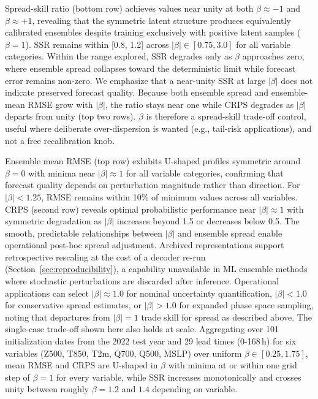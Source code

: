 \documentclass{agujournal2019}
\begin{document}
Spread-skill ratio (bottom row) achieves values near unity at both $\beta \approx -1$ and $\beta \approx +1$, revealing that the symmetric latent structure produces equivalently calibrated ensembles despite training exclusively with positive latent samples ($\beta = 1$). SSR remains within [0.8, 1.2] across $|\beta| \in [0.75, 3.0]$ for all variable categories. Within the range explored, SSR degrades only as $\beta$ approaches zero, where ensemble spread collapses toward the deterministic limit while forecast error remains non-zero. We emphasize that a near-unity SSR at large $|\beta|$ does not indicate preserved forecast quality. Because both ensemble spread and ensemble-mean RMSE grow with $|\beta|$, the ratio stays near one while CRPS degrades as $|\beta|$ departs from unity (top two rows). $\beta$ is therefore a spread-skill trade-off control, useful where deliberate over-dispersion is wanted (e.g., tail-risk applications), and not a free recalibration knob.

Ensemble mean RMSE (top row) exhibits U-shaped profiles symmetric around $\beta = 0$ with minima near $|\beta| \approx 1$ for all variable categories, confirming that forecast quality depends on perturbation magnitude rather than direction. For $|\beta| < 1.25$, RMSE remains within 10\% of minimum values across all variables. CRPS (second row) reveals optimal probabilistic performance near $|\beta| \approx 1$ with symmetric degradation as $|\beta|$ increases beyond 1.5 or decreases below 0.5. The smooth, predictable relationships between $|\beta|$ and ensemble spread enable operational post-hoc spread adjustment. Archived representations support retrospective rescaling at the cost of a decoder re-run (Section~\ref{sec:reproducibility}), a capability unavailable in ML ensemble methods where stochastic perturbations are discarded after inference. Operational applications can select $|\beta| \approx 1.0$ for nominal uncertainty quantification, $|\beta| < 1.0$ for conservative spread estimates, or $|\beta| > 1.0$ for expanded phase space sampling, noting that departures from $|\beta| = 1$ trade skill for spread as described above. The single-case trade-off shown here also holds at scale. Aggregating over 101 initialization dates from the 2022 test year and 29 lead times (0-168\,h) for six variables (Z500, T850, T2m, Q700, Q500, MSLP) over uniform $\beta \in [0.25, 1.75]$, mean RMSE and CRPS are U-shaped in $\beta$ with minima at or within one grid step of $\beta = 1$ for every variable, while SSR increases monotonically and crosses unity between roughly $\beta = 1.2$ and $1.4$ depending on variable.
\end{document}
